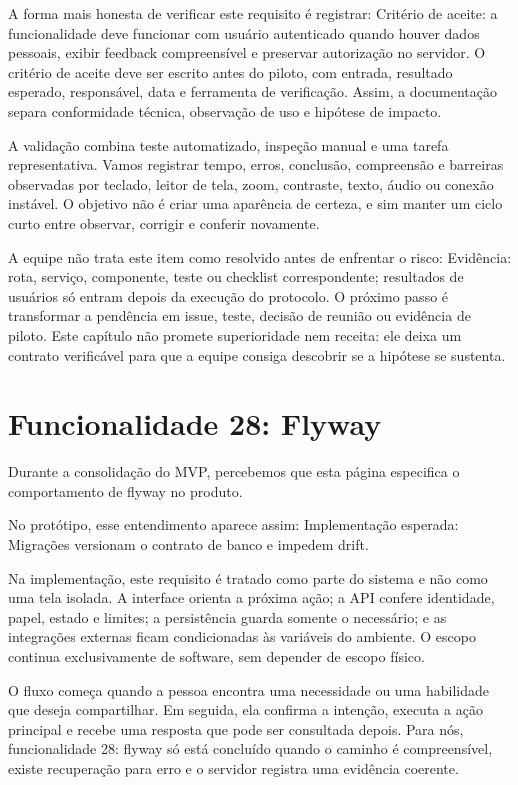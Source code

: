 \documentclass[12pt,oneside,a4paper,article]{abntex2}
\begin{document}
A forma mais honesta de verificar este requisito é registrar: Critério de aceite: a funcionalidade deve funcionar com usuário autenticado quando houver dados pessoais, exibir feedback compreensível e preservar autorização no servidor. O critério de aceite deve ser escrito antes do piloto, com entrada, resultado esperado, responsável, data e ferramenta de verificação. Assim, a documentação separa conformidade técnica, observação de uso e hipótese de impacto.

A validação combina teste automatizado, inspeção manual e uma tarefa representativa. Vamos registrar tempo, erros, conclusão, compreensão e barreiras observadas por teclado, leitor de tela, zoom, contraste, texto, áudio ou conexão instável. O objetivo não é criar uma aparência de certeza, e sim manter um ciclo curto entre observar, corrigir e conferir novamente.

A equipe não trata este item como resolvido antes de enfrentar o risco: Evidência: rota, serviço, componente, teste ou checklist correspondente; resultados de usuários só entram depois da execução do protocolo. O próximo passo é transformar a pendência em issue, teste, decisão de reunião ou evidência de piloto. Este capítulo não promete superioridade nem receita: ele deixa um contrato verificável para que a equipe consiga descobrir se a hipótese se sustenta.

\section{Funcionalidade 28: Flyway}
Durante a consolidação do MVP, percebemos que esta página especifica o comportamento de flyway no produto.

No protótipo, esse entendimento aparece assim: Implementação esperada: Migrações versionam o contrato de banco e impedem drift.

Na implementação, este requisito é tratado como parte do sistema e não como uma tela isolada. A interface orienta a próxima ação; a API confere identidade, papel, estado e limites; a persistência guarda somente o necessário; e as integrações externas ficam condicionadas às variáveis do ambiente. O escopo continua exclusivamente de software, sem depender de escopo físico.

O fluxo começa quando a pessoa encontra uma necessidade ou uma habilidade que deseja compartilhar. Em seguida, ela confirma a intenção, executa a ação principal e recebe uma resposta que pode ser consultada depois. Para nós, funcionalidade 28: flyway só está concluído quando o caminho é compreensível, existe recuperação para erro e o servidor registra uma evidência coerente.
\end{document}
